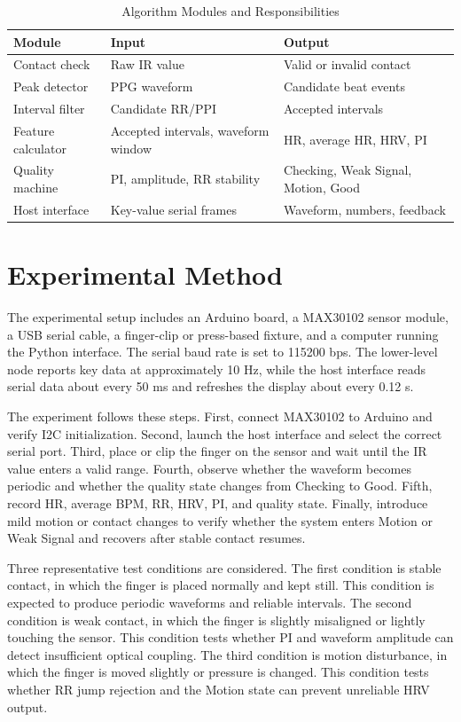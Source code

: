\documentclass[10pt,conference]{IEEEtran}
\begin{document}
\begin{table}[t]
\centering
\caption{Algorithm Modules and Responsibilities}
\label{tab:modules}
\begin{tabular}{p{2.1cm}p{2.5cm}p{2.7cm}}
\toprule
\textbf{Module} & \textbf{Input} & \textbf{Output} \\
\midrule
Contact check & Raw IR value & Valid or invalid contact \\
Peak detector & PPG waveform & Candidate beat events \\
Interval filter & Candidate RR/PPI & Accepted intervals \\
Feature calculator & Accepted intervals, waveform window & HR, average HR, HRV, PI \\
Quality machine & PI, amplitude, RR stability & Checking, Weak Signal, Motion, Good \\
Host interface & Key-value serial frames & Waveform, numbers, feedback \\
\bottomrule
\end{tabular}
\end{table}

\section{Experimental Method}
The experimental setup includes an Arduino board, a MAX30102 sensor module, a USB serial cable, a finger-clip or press-based fixture, and a computer running the Python interface. The serial baud rate is set to 115200 bps. The lower-level node reports key data at approximately 10 Hz, while the host interface reads serial data about every 50 ms and refreshes the display about every 0.12 s.

The experiment follows these steps. First, connect MAX30102 to Arduino and verify I2C initialization. Second, launch the host interface and select the correct serial port. Third, place or clip the finger on the sensor and wait until the IR value enters a valid range. Fourth, observe whether the waveform becomes periodic and whether the quality state changes from Checking to Good. Fifth, record HR, average BPM, RR, HRV, PI, and quality state. Finally, introduce mild motion or contact changes to verify whether the system enters Motion or Weak Signal and recovers after stable contact resumes.


Three representative test conditions are considered. The first condition is stable contact, in which the finger is placed normally and kept still. This condition is expected to produce periodic waveforms and reliable intervals. The second condition is weak contact, in which the finger is slightly misaligned or lightly touching the sensor. This condition tests whether PI and waveform amplitude can detect insufficient optical coupling. The third condition is motion disturbance, in which the finger is moved slightly or pressure is changed. This condition tests whether RR jump rejection and the Motion state can prevent unreliable HRV output.
\end{document}
